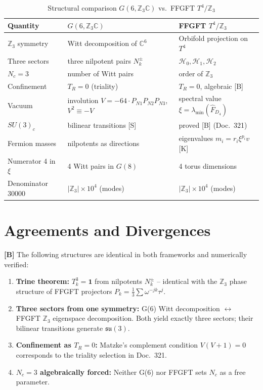 \begin{table}[h]
\centering
\caption{Structural comparison $G(6,\mathbb{Z}_3\mathbb{C})$ vs.\ FFGFT $T^4/\mathbb{Z}_3$}
\label{tab:vergleich}
\begin{tabular}{lll}
\toprule
Quantity & $G(6,\mathbb{Z}_3\mathbb{C})$ & FFGFT $T^4/\mathbb{Z}_3$ \\
\midrule
$\mathbb{Z}_3$ symmetry & Witt decomposition of $\mathbb{C}^6$ &
  Orbifold projection on $T^4$ \\
Three sectors & three nilpotent pairs $N_k^\pm$ &
  $\mathcal{H}_0, \mathcal{H}_1, \mathcal{H}_2$ \\
$N_c = 3$ & number of Witt pairs & order of $\mathbb{Z}_3$ \\
Confinement & $T_R = 0$ (triality) & $T_R = 0$, algebraic [B] \\
Vacuum & involution $V=-64\cdot P_{N1}P_{N2}P_{N3}$, $V^2\equiv -V$ &
  spectral value $\xi = \lambda_{\min}(\hat{F}_{D_4})$ \\
$SU(3)_c$ & bilinear transitions [S] & proved [B] (Doc.~321) \\
Fermion masses & nilpotents as directions &
  eigenvalues $m_i = r_i\xi^{p_i}v$ [K] \\
Numerator 4 in $\xi$ & 4 Witt pairs in $G(8)$ & 4 torus dimensions \\
Denominator 30000 & $|\mathbb{Z}_3|\times10^4$ (modes) &
  $|\mathbb{Z}_3|\times10^4$ (modes) \\
\bottomrule
\end{tabular}
\end{table}

\section{Agreements and Divergences}

\textbf{[B]} The following structures are identical in both frameworks
and numerically verified:

\begin{enumerate}
  \item \textbf{Trine theorem:} $T_k^3 = \mathbf{1}$ from nilpotents $N_k^\pm$
    -- identical with the $\mathbb{Z}_3$ phase structure of FFGFT projectors
    $P_k = \frac{1}{3}\sum\omega^{-jk}\tau^j$.
  \item \textbf{Three sectors from one symmetry:}
    G(6) Witt decomposition $\leftrightarrow$ FFGFT $\mathbb{Z}_3$
    eigenspace decomposition. Both yield exactly three sectors; their
    bilinear transitions generate $\mathfrak{su}(3)$.
  \item \textbf{Confinement as $T_R = 0$:} Matzke's complement
    condition $V(V+1) = 0$ corresponds to the triality selection
    in Doc.~321.
  \item \textbf{$N_c = 3$ algebraically forced:} Neither G(6) nor
    FFGFT sets $N_c$ as a free parameter.
\end{enumerate}

